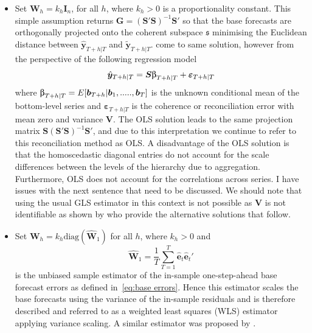 \documentclass[graybox]{svmult}
\begin{document}
\begin{itemize}
    \item Set ${\bm{W}}_{h}=k_h\bm{I}_n$, for all $h$, where $k_{h} > 0$ is a proportionality constant. This simple assumption returns $\bm{G}=(\bm{S}'\bm{S})^{-1}\bm{S}'$ so that the base forecasts are orthogonally projected onto the coherent subspace $\mathfrak{s}$ minimising the Euclidean distance between $\hat{\bm{y}}_{T+h|T}$ and $\tilde{\bm{y}}_{T+h|T}$.  \cite{HynEtAl2011} come to same solution, however from the perspective of the following regression model \begin{equation*}\hat{\bm{y}}_{T+h|T} = \bm{S\ubeta}_{T+h|T} + \bm{\varepsilon}_{T+h|T} \end{equation*} where $\bm{\ubeta}_{T+h|T}=E[\bm{b}_{T+h}|\bm{b}_1,.....,\bm{b}_T]$ is the unknown conditional mean of the bottom-level series and $\bm{\varepsilon}_{T+h|T}$ is the coherence or reconciliation error with mean zero and variance $\bm{V}$. The OLS solution leads to the same projection matrix $\bm{S}(\bm{S}'\bm{S})^{-1}\bm{S}'$, and due to this interpretation we continue to refer to this reconciliation method as OLS. A disadvantage of the OLS solution is that the homoscedastic diagonal entries do not account for the scale differences between the levels of the hierarchy due to aggregation.  Furthermore, OLS does not account for the correlations across series.  {\color{red} I have issues with the next sentence that need to be discussed}.  We should note that using the usual GLS estimator in this context is not possible as $\bm{V}$ is not identifiable as shown by \cite{WicEtAl2019} who provide the alternative solutions that follow.

    \item Set ${\bm{W}}_{h}=k_{h}\text{diag}(\hat{\bm{W}}_{1})$ for all $h$, where $k_{h} > 0$ and
        $$
        \hat{\bm{W}}_{1} = \frac{1}{T}\sum_{T=1}^{T} \hat{\bm{e}}_{t}\hat{\bm{e}}_{t}'
        $$
        is the unbiased sample estimator of the in-sample one-step-ahead base forecast errors as defined in~\eqref{eq:base errors}. Hence this estimator scales the base forecasts using the variance of the in-sample residuals and is therefore described and referred to as a weighted least squares (WLS) estimator applying variance scaling. A similar estimator was proposed by \cite{Hyndman2016}.
        

\end{itemize}
\end{document}
